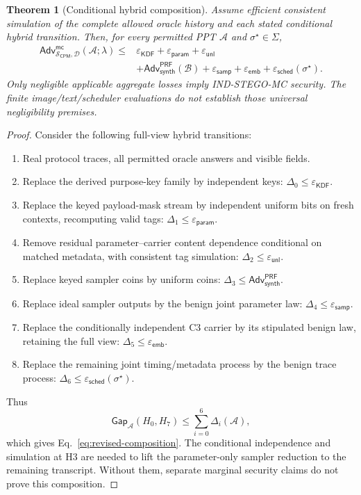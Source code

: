 \documentclass[pdflatex,sn-mathphys-num]{sn-jnl}%
\newtheorem{theorem}{Theorem}
\theoremstyle{definition}
\theoremstyle{game}
\theoremstyle{thmstyleone}%
\theoremstyle{thmstyletwo}%
\theoremstyle{thmstylethree}%
\begin{document}
\begin{theorem}[Conditional hybrid composition]\label{thm:composition}
Assume efficient consistent simulation of the complete allowed oracle
history and each stated conditional hybrid transition. Then, for every
permitted PPT $\mathcal A$ and $\sigma^\star\in\Sigma$,
\begin{align}\label{eq:revised-composition}
\mathsf{Adv}^{\mathsf{mc}}_{\mathcal S_{\mathsf{CPM}},\mathbf{\mathcal D}}(\mathcal A;\lambda)
\le{}&\varepsilon_{\mathsf{KDF}}+\varepsilon_{\mathsf{param}}+
\varepsilon_{\mathsf{unl}}\nonumber\\
&+\mathsf{Adv}^{\mathsf{PRF}}_{\mathsf{synth}}(\mathcal B)
+\varepsilon_{\mathsf{samp}}+\varepsilon_{\mathsf{emb}}
+\varepsilon_{\mathsf{sched}}(\sigma^\star).
\end{align}
Only negligible applicable aggregate losses imply IND-STEGO-MC security.
The finite image/text/scheduler evaluations do not establish those universal
negligibility premises.
\end{theorem}
\begin{proof}
Consider the following full-view hybrid transitions:
\begin{enumerate}[label=\textbf{H\arabic*.},start=0,leftmargin=2.4em]
\item Real protocol traces, all permitted oracle answers and visible fields.
\item Replace the derived purpose-key family by independent keys:
$\Delta_0\le\varepsilon_{\mathsf{KDF}}$.
\item Replace the keyed payload-mask stream by independent uniform bits
on fresh contexts, recomputing valid tags:
$\Delta_1\le\varepsilon_{\mathsf{param}}$.
\item Remove residual parameter--carrier content dependence conditional
on matched metadata, with consistent tag simulation:
$\Delta_2\le\varepsilon_{\mathsf{unl}}$.
\item Replace keyed sampler coins by uniform coins:
$\Delta_3\le\mathsf{Adv}^{\mathsf{PRF}}_{\mathsf{synth}}$.
\item Replace ideal sampler outputs by the benign joint parameter law:
$\Delta_4\le\varepsilon_{\mathsf{samp}}$.
\item Replace the conditionally independent C3 carrier by its stipulated
benign law, retaining the full view:
$\Delta_5\le\varepsilon_{\mathsf{emb}}$.
\item Replace the remaining joint timing/metadata process by the benign
trace process: $\Delta_6\le\varepsilon_{\mathsf{sched}}(\sigma^\star)$.
\end{enumerate}
Thus
\[
\mathsf{Gap}_{\mathcal A}(H_0,H_7)
\le\sum_{i=0}^{6}\Delta_i(\mathcal A),
\]
which gives Eq.~\eqref{eq:revised-composition}. The conditional independence
and simulation at H3 are needed to lift the parameter-only sampler reduction
to the remaining transcript. Without them, separate marginal security
claims do not prove this composition.
\end{proof}
\end{document}
